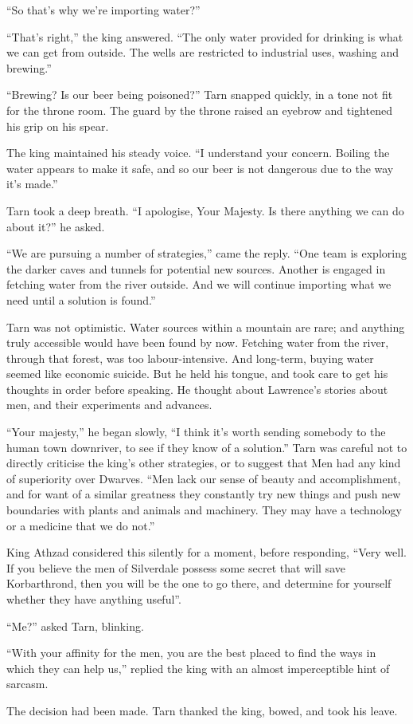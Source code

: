 ``So that's why we're importing water?''

``That's right,'' the king answered.  ``The only water provided for drinking is what we can get from outside.  The wells are restricted to industrial uses, washing and brewing.''

``Brewing?  Is our beer being poisoned?'' Tarn snapped quickly, in a tone not fit for the throne room.  The guard by the throne raised an eyebrow and tightened his grip on his spear.

The king maintained his steady voice.  ``I understand your concern.  Boiling the water appears to make it safe, and so our beer is not dangerous due to the way it's made.''

Tarn took a deep breath.  ``I apologise, Your Majesty.  Is there anything we can do about it?'' he asked.

``We are pursuing a number of strategies,'' came the reply.  ``One team is exploring the darker caves and tunnels for potential new sources.  Another is engaged in fetching water from the river outside.  And we will continue importing what we need until a solution is found.''

Tarn was not optimistic.  Water sources within a mountain are rare; and anything truly accessible would have been found by now.  Fetching water from the river, through that forest, was too labour-intensive.  And long-term, buying water seemed like economic suicide.  But he held his tongue, and took care to get his thoughts in order before speaking.  He thought about Lawrence's stories about men, and their experiments and advances.

``Your majesty,'' he began slowly, ``I think it's worth sending somebody to the human town downriver, to see if they know of a solution.''  Tarn was careful not to directly criticise the king's other strategies, or to suggest that Men had any kind of superiority over Dwarves.
``Men lack our sense of beauty and accomplishment, and for want of a similar greatness they constantly try new things and push new boundaries with plants and animals and machinery.  They may have a technology or a medicine that we do not.''

King Athzad considered this silently for a moment, before responding, ``Very well.  If you believe the men of Silverdale possess some secret that will save Korbarthrond, then you will be the one to go there, and determine for yourself whether they have anything useful''.

``Me?'' asked Tarn, blinking.

``With your affinity for the men, you are the best placed to find the ways in which they can help us,'' replied the king with an almost imperceptible hint of sarcasm.

The decision had been made.  Tarn thanked the king, bowed, and took his leave.